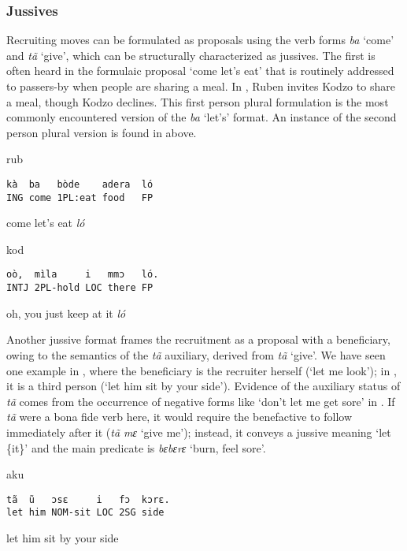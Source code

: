 \documentclass[output=paper]{langsci/langscibook}
\begin{document}
\normalsize
\subsubsection{Jussives}
Recruiting moves can be formulated as proposals using the verb forms \textit{ba} ‘come’ and \textit{tã} ‘give’, which can be structurally characterized as jussives. The first is often heard in the formulaic proposal ‘come let’s eat’ that is routinely addressed to passers-by when people are sharing a meal. In  , Ruben invites Kodzo to share a meal, though Kodzo declines. This first person plural formulation is the most commonly encountered version of the \textit{ba} ‘let’s’ format. An instance of the second person plural version is found in  above.

\vspace{2mm}
%
\begin{transbox}{1}{rub}
\begin{verbatim}
kà  ba   bòde    adera  ló
ING come 1PL:eat food   FP
\end{verbatim}
come let’s eat \textit{ló}
\end{transbox}
%
\begin{transbox}{2}{kod}
\begin{verbatim}
oò,  mìla     i   mmɔ   ló.
INTJ 2PL-hold LOC there FP
\end{verbatim}
oh, you just keep at it \textit{ló}
\end{transbox}\bigskip

\normalsize
Another jussive format frames the recruitment as a proposal with a beneficiary, owing to the semantics of the \textit{tã} auxiliary, derived from \textit{tã} ‘give’. We have seen one example in , where the beneficiary is the recruiter herself (‘let me look’); in , it is a third person (‘let him sit by your side’). Evidence of the auxiliary status of \textit{tã} comes from the occurrence of negative forms like ‘don’t let me get sore’ in . If \textit{tã} were a bona fide verb here, it would require the benefactive to follow immediately after it (\textit{tã mɛ} ‘give me’); instead, it conveys a jussive meaning ‘let \{it\}’ and the main predicate is \textit{bɛbɛrɛ} ‘burn, feel sore’.

\vspace{2mm}
%
\begin{transbox}{4}{aku}
\begin{verbatim}
tã  ũ   ɔsɛ     i   fɔ  kɔrɛ.
let him NOM-sit LOC 2SG side
\end{verbatim}
let him sit by your side
\end{transbox}\medskip
\end{document}
